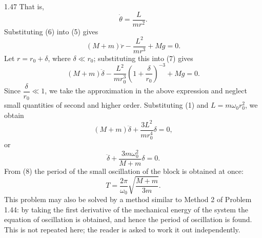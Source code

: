\begin{solution}{1.47}
That is,
\begin{equation}
\dot{\theta}=\frac{L}{mr^2}. \tag{6}
\end{equation}
Substituting (6) into (5) gives
\begin{equation}
(M+m)\ddot{r}-\frac{L^2}{mr^3}+Mg=0. \tag{7}
\end{equation}
Let $r=r_0+\delta$, where $\delta\ll r_0$; substituting this into (7) gives
\[
(M+m)\ddot{\delta}-\frac{L^2}{mr_0^3}\left(1+\frac{\delta}{r_0}\right)^{-3}+Mg=0.
\]
Since $\dfrac{\delta}{r_0}\ll1$, we take the approximation in the above expression and neglect small quantities of second and higher order. Substituting (1) and $L=m\omega_0r_0^2$, we obtain
\[
(M+m)\ddot{\delta}+\frac{3L^2}{mr_0^4}\delta=0,
\]
or
\begin{equation}
\ddot{\delta}+\frac{3m\omega_0^2}{M+m}\delta=0. \tag{8}
\end{equation}
From (8) the period of the small oscillation of the block is obtained at once:
\[
T=\frac{2\pi}{\omega_0}\sqrt{\frac{M+m}{3m}}.
\]
This problem may also be solved by a method similar to Method 2 of Problem 1.44: by taking the first derivative of the mechanical energy of the system the equation of oscillation is obtained, and hence the period of oscillation is found. This is not repeated here; the reader is asked to work it out independently.
\end{solution}


